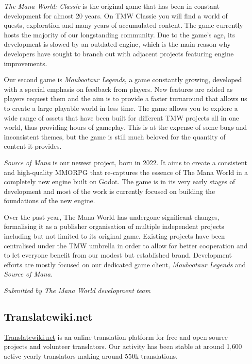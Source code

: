 \documentclass[a4paper]{report}
\begin{document}
{\em The Mana World: Classic} is the original game that has been in constant development for almost 20 years. On TMW Classic you will find a world of quests, exploration and many years of accumulated content. The game currently hosts the majority of our longstanding community. Due to the game's age, its development is slowed by an outdated engine, which is the main reason why developers have sought to branch out with adjacent projects featuring engine improvements.

Our second game is {\em Moubootaur Legends}, a game constantly growing, developed with a special emphasis on feedback from players. New features are added as players request them and the aim is to provide a faster turnaround that allows us to create a large playable world in less time. The game allows you to explore a wide range of assets that have been built for different TMW projects all in one world, thus providing hours of gameplay. This is at the expense of some bugs and inconsistent themes, but the game is still much beloved for the quantity of content it provides.

{\em Source of Mana} is our newest project, born in 2022. It aims to create a consistent and high-quality MMORPG that re-captures the essence of The Mana World in a completely new engine built on Godot. The game is in its very early stages of development and most of the work is currently focused on building the foundations of the new engine.

Over the past year, The Mana World has undergone significant changes, formalising it as a publisher organisation of multiple independent projects including but not limited to its original game. Existing projects have been centralised under the TMW umbrella in order to allow for better cooperation and to let everyone benefit from our modest but established brand. Development efforts are mostly focused on our dedicated game client, {\em Moubootaur Legends} and {\em Source of Mana}.

{\em Submitted by The Mana World development team}

\subsection{Translatewiki.net}

\href{https://translatewiki.net/}{Translatewiki.net} is an online translation platform for free and open source projects and volunteer translators. Our activity has been stable at around 1,600 active yearly translators making around 550k translations.
\end{document}
